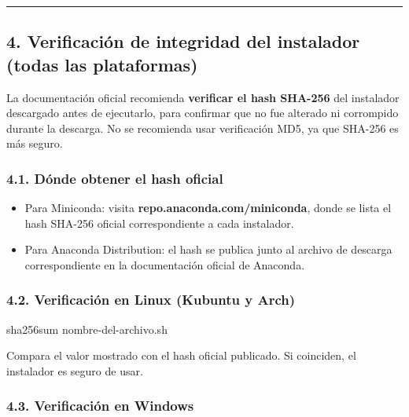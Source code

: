 \documentclass[
  doc,
  floatsintext,
  longtable,
  a4paper,
  nolmodern,
  notxfonts,
  notimes,
  12pt,
  colorlinks=true,linkcolor=blue,citecolor=blue,urlcolor=blue]{apa7}
\newenvironment{Shaded}{\begin{snugshade}}{\end{snugshade}}
\newcommand{\FunctionTok}[1]{\textcolor[rgb]{0.28,0.35,0.67}{#1}}
\newcommand{\NormalTok}[1]{\textcolor[rgb]{0.00,0.23,0.31}{#1}}
\providecommand{\tightlist}{%
  \setlength{\itemsep}{0pt}\setlength{\parskip}{0pt}}
\begin{document}
\begin{center}\rule{0.5\linewidth}{0.5pt}\end{center}

\subsection{4. Verificación de integridad del instalador (todas las
plataformas)}\label{verificaciuxf3n-de-integridad-del-instalador-todas-las-plataformas}

La documentación oficial recomienda \textbf{verificar el hash SHA-256}
del instalador descargado antes de ejecutarlo, para confirmar que no fue
alterado ni corrompido durante la descarga. No se recomienda usar
verificación MD5, ya que SHA-256 es más seguro.

\subsubsection{4.1. Dónde obtener el hash
oficial}\label{duxf3nde-obtener-el-hash-oficial}

\begin{itemize}
\tightlist
\item
  Para Miniconda: visita \textbf{repo.anaconda.com/miniconda}, donde se
  lista el hash SHA-256 oficial correspondiente a cada instalador.
\item
  Para Anaconda Distribution: el hash se publica junto al archivo de
  descarga correspondiente en la documentación oficial de Anaconda.
\end{itemize}

\subsubsection{4.2. Verificación en Linux (Kubuntu y
Arch)}\label{verificaciuxf3n-en-linux-kubuntu-y-arch}

\begin{Shaded}
\begin{Highlighting}[]
\FunctionTok{sha256sum}\NormalTok{ nombre{-}del{-}archivo.sh}
\end{Highlighting}
\end{Shaded}

Compara el valor mostrado con el hash oficial publicado. Si coinciden,
el instalador es seguro de usar.

\subsubsection{4.3. Verificación en
Windows}\label{verificaciuxf3n-en-windows}
\end{document}
